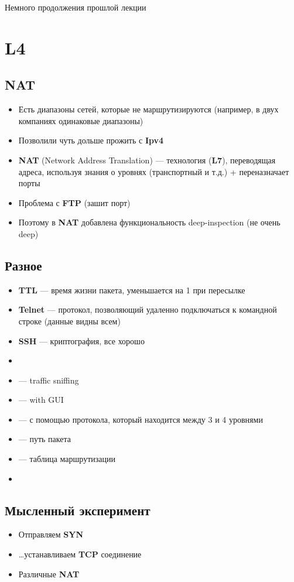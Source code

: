 Немного продолжения прошлой лекции

\section{L4}
\subsection{NAT}
\begin{itemize}
    \item Есть диапазоны сетей, которые не маршрутизируются (например, в двух компаниях одинаковые диапазоны)
    \item Позволили чуть дольше прожить с \textbf{Ipv4}
    \item \textbf{NAT} (Network Address Translation) --- технология (\textbf{L7}),  переводящая адреса, используя знания о уровнях (транспортный и т.д.) + переназначает порты
    \item Проблема с \textbf{FTP} (зашит порт)
    \item Поэтому в \textbf{NAT} добавлена функциональность deep-inspection (не очень deep)
\end{itemize}

\subsection{Разное}
\begin{itemize}
    \item \textbf{TTL} --- время жизни пакета, уменьшается на 1 при пересылке
    \item \textbf{Telnet} --- протокол, позволяющий удаленно подключаться к командной строке (данные видны всем)
    \item \textbf{SSH} --- криптография, все хорошо
    \item {}
    \item {} --- traffic sniffing
    \item {} --- with GUI
    \item {} --- с помощью протокола, который находится между 3 и 4 уровнями
    \item {} --- путь пакета
    \item {} --- таблица маршрутизации
    \item {}
\end{itemize}

\subsection{Мысленный эксперимент}
\begin{itemize}
    \item Отправляем \textbf{SYN}
    \item \dots устанавливаем \textbf{TCP} соединение
    \item Различные \textbf{NAT}
\end{itemize}

